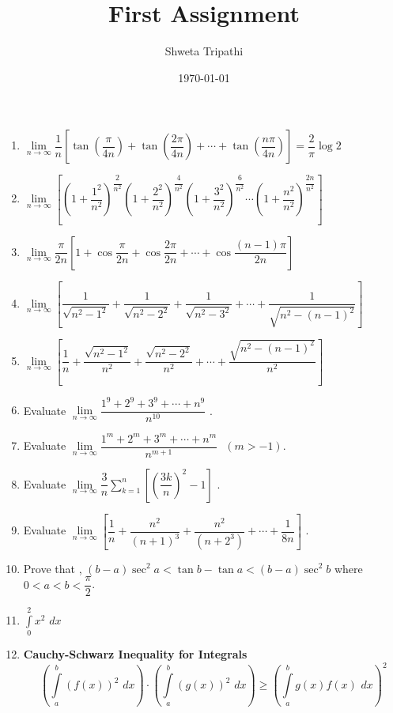 \documentclass[11pt, a4paper]{article}
\title{First Assignment}
\author{Shweta Tripathi}
\date{\today}
\begin{document}
\maketitle

\begin{enumerate}
\item$\displaystyle{\lim\limits_{n\rightarrow\infty}\dfrac{1}{n}\left[\tan\left(\dfrac{\pi}{4n}\right)+\tan\left(\dfrac{2\pi}{4n}\right) + \cdots +  \tan  \left(\dfrac{n\pi}{4n} \right) \right]}=\dfrac{2}{\pi}\log2$

\item $ \lim\limits_{n\rightarrow \infty } \left[  \left( 1+\dfrac{1^2}{n^2}\right)^{\dfrac{2}{n^2}} \left( 1+\dfrac{2^2}{n^2}\right)^{\dfrac{4}{n^2}} \left( 1+\dfrac{3^2}{n^2}\right)^{\dfrac{6}{n^2}} \cdots \left( 1+\dfrac{n^2}{n^2}\right)^{\dfrac{2n}{n^2}} \right]$

\item $ \displaystyle{ \lim\limits_{n\rightarrow\infty}
 \dfrac{\pi}{2n} \left[ 1+ \cos\dfrac{\pi}{2n} + \cos\dfrac{2\pi}{2n} + \cdots + \cos\dfrac{(n-1)\pi}{2n}\right]}$

\item $ \lim\limits_{n\rightarrow\infty} \left[ \dfrac{1}{\sqrt{n^2-1^2}} +\dfrac{1}{\sqrt{n^2-2^2}} + \dfrac{1}{\sqrt{n^2-3^2}} + \cdots + \dfrac{1}{\sqrt{n^2-(n-1)^2}} \right]$

\item $ \lim\limits_{n\rightarrow\infty} \left[ \dfrac{1}{n} + \dfrac{\sqrt{n^2-1^2}}{n^2} +\dfrac{\sqrt{n^2-2^2}}{n^2} + \cdots + \dfrac{\sqrt{n^2-(n-1)^2}}{n^2} \right]$

\item Evaluate $ \lim\limits_{n\rightarrow\infty} \dfrac{1^9+2^9+3^9+ \cdots +n^9}{n^{10}}$ . 

\item Evaluate $ \lim\limits_{n\rightarrow\infty} \dfrac{1^m+2^m+3^m+ \cdots + n^m}{n^{m+1}} \hspace{8pt} (m>-1)$.

\item Evaluate $\displaystyle{ \lim\limits_{n\rightarrow\infty} \dfrac{3}{n} \sum\limits_{k=1}^{n} \left[ \left( \dfrac{3k}{n}\right)^2 -1\right]}$ .

\item Evaluate $ \lim\limits_{n\rightarrow\infty} \left[   \dfrac{1}{n} + \dfrac{n^2}{(n+1)^3} +\dfrac{n^2}{(n+2^3)}+
\cdots +\dfrac{1}{8n}\right]$ .

\item Prove that , $ (b-a)\sec^2a<\tan b-\tan a<(b-a)\sec^2b$ where $0<a<b<\dfrac{\pi}{2}$.

\item $\displaystyle{ \int \limits_{0}^{2} x^2\hspace{4pt} dx }$

\item \textbf{Cauchy-Schwarz Inequality for Integrals}
$$\displaystyle{ \left( \int \limits_{a}^{b} (f(x))^2 \hspace{4pt} dx \right)\cdot \left( \int \limits_{a}^{b} (g(x))^2 \hspace{4pt} dx \right)\geq \left( \int \limits_{a}^{b} g(x)f(x) \hspace{4pt} dx \right)^2 }$$
\end{enumerate}
\end{document}
